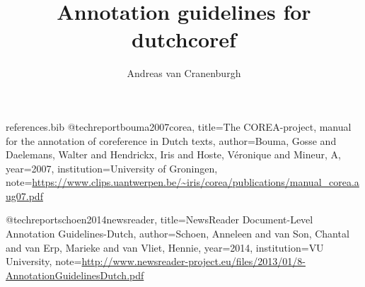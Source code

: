 \RequirePackage{filecontents}
\begin{filecontents}{references.bib}
@techreport{bouma2007corea,
  title={The COREA-project, manual for the annotation of coreference in Dutch texts},
  author={Bouma, Gosse and Daelemans, Walter and Hendrickx, Iris and Hoste, V{\'e}ronique and Mineur, A},
  year={2007},
  institution={University of Groningen},
  note={\url{https://www.clips.uantwerpen.be/~iris/corea/publications/manual_corea.aug07.pdf}}
}

@techreport{schoen2014newsreader,
  title={NewsReader Document-Level Annotation Guidelines-Dutch},
  author={Schoen, Anneleen and van Son, Chantal and van Erp, Marieke and van Vliet, Hennie},
  year={2014},
  institution={VU University},
  note={\url{http://www.newsreader-project.eu/files/2013/01/8-AnnotationGuidelinesDutch.pdf}}
} 
\end{filecontents}
\documentclass[a4paper]{article}
\usepackage[T1]{fontenc}
\usepackage[utf8]{inputenc}
\usepackage{kpfonts, mdwlist, microtype, xcolor, natbib}
\usepackage[unicode=true]{hyperref}
\setlength{\emergencystretch}{3em}  %
\newcommand{\n}[1]{\textcolor{red}{#1}}

\title{Annotation guidelines for dutchcoref}
\author{Andreas van Cranenburgh}
\date{}


\maketitle

\section{How to annotate?}

\begin{itemize*}
\item Read the text from start to finish, make and correct annotations as
  you go.
\item Identify mentions by asking yourself whether a span of text describes
  a specific identifiable object or person.
\item When the same entity is referred to again, ensure that both mentions
  are assigned to the same coreference cluster. Conversely, remove any
  incorrect links.
\end{itemize*}

\section{Mentions}

